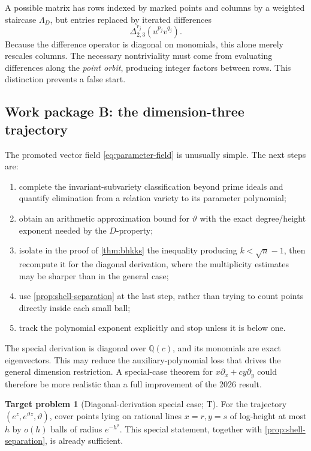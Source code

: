 \documentclass[10pt,oneside]{article}
\theoremstyle{definition}
\newtheorem{problem}[theorem]{Target problem}
\theoremstyle{remark}
\newcommand{\Q}{\mathbb Q}
\newcommand{\thetaq}{\vartheta}
\newcommand{\statusT}{\textsc{T}}
\begin{document}
A possible matrix has rows indexed by marked points and columns by a weighted staircase \(\Lambda_D\), but entries replaced by iterated differences
\[
 \Delta_{2,3}^{r_j}(u^{p_j}v^{q_j}).
\]
Because the difference operator is diagonal on monomials, this alone merely rescales columns.  The necessary nontriviality must come from evaluating differences along the \emph{point orbit}, producing integer factors between rows.  This distinction prevents a false start.

\subsection{Work package B: the dimension-three trajectory}
The promoted vector field \eqref{eq:parameter-field} is unusually simple.  The next steps are:
\begin{enumerate}[label=\textbf{B\arabic*.}]
\item complete the invariant-subvariety classification beyond prime ideals and quantify elimination from a relation variety to its parameter polynomial;
\item obtain an arithmetic approximation bound for \(\thetaq\) with the exact degree/height exponent needed by the \(D\)-property;
\item isolate in the proof of \cref{thm:bhkks} the inequality producing \(k<\sqrt n-1\), then recompute it for the diagonal derivation, where the multiplicity estimates may be sharper than in the general case;
\item use \cref{prop:shell-separation} at the last step, rather than trying to count points directly inside each small ball;
\item track the polynomial exponent explicitly and stop unless it is below one.
\end{enumerate}

The special derivation is diagonal over \(\Q(c)\), and its monomials are exact eigenvectors.  This may reduce the auxiliary-polynomial loss that drives the general dimension restriction.  A special-case theorem for \(x\partial_x+cy\partial_y\) could therefore be more realistic than a full improvement of the 2026 result.

\begin{problem}[Diagonal-derivation special case; \statusT]
\label{prob:diagonal-special}
For the trajectory \((e^z,e^{\thetaq z},\thetaq)\), cover points lying on rational lines \(x=r,y=s\) of log-height at most \(h\) by \(o(h)\) balls of radius \(e^{-h^\rho}\).  This special statement, together with \cref{prop:shell-separation}, is already sufficient.
\end{problem}
\end{document}
